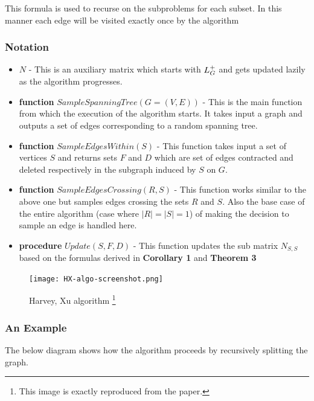 This formula is used to recurse on the subproblems for each subset. In this manner each edge will be visited exactly once by the algorithm

\subsubsection{Notation}
\begin{itemize}
 \item $N$ - This is an auxiliary matrix which starts with $L_{G}^{+}$ and gets updated lazily as the algorithm progresses.
 \item \textbf{function} $SampleSpanningTree(G = (V, E))$ - This is the main function from which the execution of the algorithm starts. It takes input a graph and outputs a set of edges corresponding to a random spanning tree.
 \item \textbf{function} $SampleEdgesWithin(S)$ - This function takes input a set of vertices $S$ and returns sets $F$ and $D$ which are set of edges contracted and deleted respectively in the subgraph induced by $S$ on $G$. 
 \item \textbf{function} $SampleEdgesCrossing(R,S)$ - This function works similar to the above one but samples edges crossing the sets $R$ and $S$. Also the base case of the entire algorithm (case where $|R| = |S| = 1$) of making the decision to sample an edge is handled here.
 \item \textbf{procedure} $Update(S,F,D)$ - This function updates the sub matrix $N_{S,S}$ based on the formulas derived in \textbf{Corollary 1} and \textbf{Theorem 3}
\end{itemize}

\pagebreak


\begin{figure}[h!]
\begin{minipage}{\textwidth}
      \texttt{[image: HX-algo-screenshot.png]}
    \caption[Harvey, Xu algorithm]%
    {Harvey, Xu algorithm \footnote{This image is exactly reproduced from the paper.} }
  \end{minipage}

  \label{fig:alg}
\end{figure}
\pagebreak


\subsubsection{An Example}
The below diagram shows how the algorithm proceeds by recursively splitting the graph.

